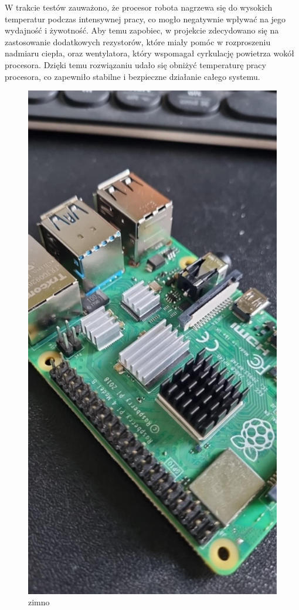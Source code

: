 W trakcie testów zauważono, że procesor robota nagrzewa się do wysokich temperatur podczas intensywnej pracy, 
co mogło negatywnie wpływać na jego wydajność i żywotność. Aby temu zapobiec, w projekcie zdecydowano się na 
zastosowanie dodatkowych rezystorów, które miały pomóc w rozproszeniu nadmiaru ciepła, oraz wentylatora, który 
wspomagał cyrkulację powietrza wokół procesora. Dzięki temu rozwiązaniu udało się obniżyć temperaturę pracy 
procesora, co zapewniło stabilne i bezpieczne działanie całego systemu.

\begin{figure}[H]
    \centering
    \includegraphics[width=0.25\linewidth]{chapters/03-praca-wlasna/figures/now_we_are_cool.png}
    \caption{\label{fig:zimno}zimno}
\end{figure}

